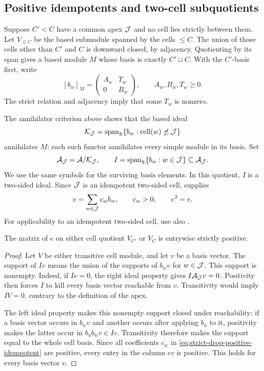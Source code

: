 \subsection{Positive idempotents and two-cell subquotients}

Suppose $C'<C$ have a common apex $\mathcal{J}$ and no cell lies strictly between
them. Let $V_{\leq C}$ be the based submodule spanned by the cells $\leq C$.
The union of those cells other than $C'$ and $C$ is downward closed, by
adjacency. Quotienting by its span gives a based module $M$ whose basis is
exactly $C'\sqcup C$. With the $C'$-basis first, write
\begin{equation}\label{eq:strict-drop-block-action}
  [b_w]_M=
  \begin{pmatrix}
    A_w&T_w\\
    0&B_w
  \end{pmatrix},
  \qquad A_w,B_w,T_w\geq0.
\end{equation}
The strict relation and adjacency imply that some $T_w$ is nonzero.

The annihilator criterion above shows that the based ideal
\[
  \mathcal K_{\mathcal{J}}
  =\operatorname{span}_{\mathbb{R}}
    \{b_w:\operatorname{cell}(w)\not\preceq\mathcal{J}\}
\]
annihilates $M$: each such functor annihilates every simple module in its
basis. Set
\[
  \mathcal A_{\mathcal{J}}=\mathcal A/\mathcal K_{\mathcal{J}},
  \qquad
  I=\operatorname{span}_{\mathbb{R}}\{b_w:w\in\mathcal{J}\}
       \subseteq\mathcal A_{\mathcal{J}}.
\]
We use the same symbols for the surviving basis elements. In this quotient,
$I$ is a two-sided ideal. Since $\mathcal{J}$ is an idempotent two-sided cell,
\cite[Prop.~18(i)]{KildetoftMazorchuk2016} supplies
\begin{equation}\label{eq:strict-drop-positive-idempotent}
  e=\sum_{w\in\mathcal{J}}c_wb_w,
  \qquad c_w>0,\qquad e^2=e.
\end{equation}
For applicability to an idempotent two-sided cell, use also
\cite[Prop.~17]{KildetoftMazorchuk2016}.

\begin{lem}\label{lem:strict-drop-positive-on-cell}
The matrix of $e$ on either cell quotient $V_{C'}$ or $V_C$ is entrywise
strictly positive.
\end{lem}

\begin{proof}
Let $V$ be either transitive cell module, and let $v$ be a basis vector.
The support of $Iv$ means the union of the supports of $b_wv$ for
$w\in\mathcal{J}$. This support is nonempty. Indeed, if $Iv=0$, the right ideal
property gives $I\mathcal A_{\mathcal{J}}v=0$. Positivity then forces $I$ to kill
every basis vector reachable from $v$. Transitivity would imply $IV=0$,
contrary to the definition of the apex.

The left ideal property makes this nonempty support closed under
reachability: if a basis vector occurs in $b_wv$ and another occurs after
applying $b_u$ to it, positivity makes the latter occur in $b_ub_wv\in Iv$.
Transitivity therefore makes the support equal to the whole cell basis.
Since all coefficients $c_w$ in
\eqref{eq:strict-drop-positive-idempotent} are positive, every entry in the
column $ev$ is positive. This holds for every basis vector $v$.
\end{proof}

